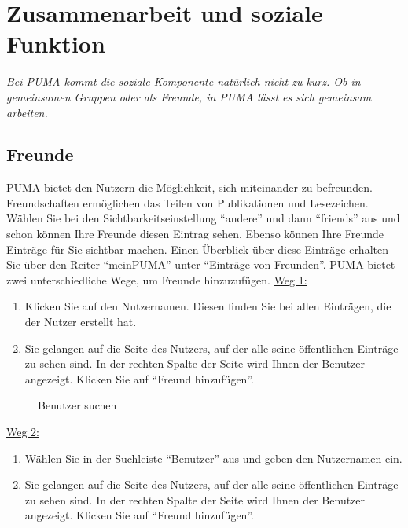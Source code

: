 \chapter{Zusammenarbeit und soziale Funktion}
\label{ch:zusammenarbeit}
\textit{Bei PUMA kommt die soziale Komponente natürlich nicht zu kurz. Ob in gemeinsamen Gruppen oder als Freunde, in PUMA lässt es sich gemeinsam arbeiten.}
\section{Freunde}%
\label{sec:freunde}
PUMA bietet den Nutzern die Möglichkeit, sich miteinander zu befreunden. Freundschaften ermöglichen das Teilen von Publikationen und Lesezeichen. Wählen Sie bei den Sichtbarkeitseinstellung \enquote{andere} und dann \enquote{friends} aus und schon können Ihre Freunde diesen Eintrag sehen. Ebenso können Ihre Freunde Einträge für Sie sichtbar machen. Einen Überblick über diese Einträge erhalten Sie über den Reiter \enquote{meinPUMA} unter \enquote{Einträge von Freunden}.\newline
PUMA bietet zwei unterschiedliche Wege, um Freunde hinzuzufügen.
\newline
\newline
\underline{Weg 1:}
\begin{enumerate} 
    \item Klicken Sie auf den Nutzernamen. Diesen finden Sie bei allen Einträgen, die der Nutzer erstellt hat.
    \item Sie gelangen auf die Seite des Nutzers, auf der alle seine öffentlichen Einträge zu sehen sind. In der rechten Spalte der Seite wird Ihnen der Benutzer angezeigt. Klicken Sie auf \enquote{Freund hinzufügen}.
\end{enumerate}
\begin{figure}[h!]
 \centering
 \caption{Benutzer suchen}
 \label{fig:benutzerSuchen}
\end{figure}
\underline{Weg 2:}
\begin{enumerate}
    \item Wählen Sie in der Suchleiste \enquote{Benutzer} aus und geben den Nutzernamen ein.
    \item Sie gelangen auf die Seite des Nutzers, auf der alle seine öffentlichen Einträge zu sehen sind. In der rechten Spalte der Seite wird Ihnen der Benutzer angezeigt. Klicken Sie auf \enquote{Freund hinzufügen}.
\end{enumerate}
